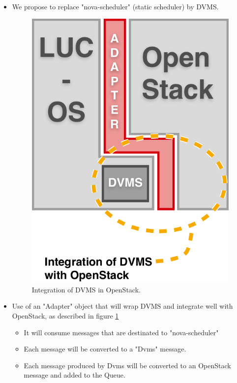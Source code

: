 \begin{itemize}

\item We propose to replace "nova-scheduler" (static scheduler) by DVMS.

\begin{figure}[h]
	\centering
	\includegraphics[width=0.50\linewidth]{Figures/dvms_openstack.pdf}
	\caption{Integration of DVMS in OpenStack.}%
	\label{fig:integration}%
\end{figure}

\item Use of an "Adapter" object that will wrap DVMS and integrate well with OpenStack, as described in figure \ref{fig:integration}
	\begin{itemize}
		\item It will consume messages that are destinated to "nova-scheduler"

		\item Each message will be converted to a "Dvms" message.

		\item Each message produced by Dvms will be converted to an OpenStack message and added to the Queue.

	\end{itemize}



\end{itemize}